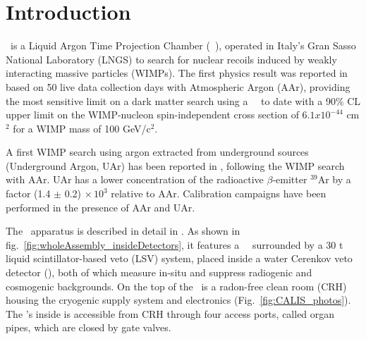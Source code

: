 \section{Introduction}\label{sec:intro}\label{sec:introduction}


\dsf\ is a Liquid Argon Time Projection Chamber (\lar\ \tpc), operated in Italy's Gran Sasso National Laboratory (LNGS) to search for nuclear recoils induced by weakly interacting massive particles (WIMPs). The first physics result was reported in \cite{Agnes:2015gu} based on 50 live data collection days with Atmospheric Argon (AAr), providing the most sensitive limit on a dark matter search using a \lar\ \tpc\ to date with a 90\% CL upper limit on the WIMP-nucleon spin-independent cross section of $6.1 x 10^{-44}$ cm$^2$ for a WIMP mass of 100 GeV/c$^2$.  %

A first WIMP search using argon extracted from underground sources (Underground Argon, UAr) has been reported in \cite{Agnes:2015_uar}, following the WIMP search with AAr. UAr has a lower concentration of the radioactive $\beta$-emitter $^{39}$Ar by a factor (1.4 $\pm$ 0.2) $\times\, 10^3$ relative to AAr. Calibration campaigns have been performed in the presence of AAr and UAr.

The \dsf\ apparatus is described in detail in \cite{Agnes:2015gu}. As shown in fig.~\ref{fig:wholeAssembly_insideDetectors}, it features a \lar\ \tpc\ surrounded by a 30 t liquid scintillator-based veto (LSV) system, placed inside a water Cerenkov veto detector (\wcv), both of which measure in-situ and suppress radiogenic and cosmogenic backgrounds. On the top of the \wcv\ is a radon-free clean room (CRH) housing the cryogenic supply system and electronics (Fig.~\ref{fig:CALIS_photos}). The \lsv's inside is accessible from CRH through four access ports, called organ pipes, which are closed by gate valves. 


